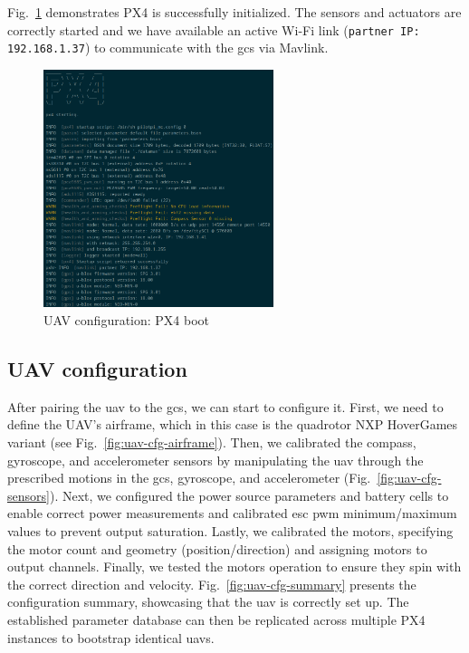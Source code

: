 Fig.~\ref{fig:uav-cfg-px4-boot} demonstrates PX4 is successfully
initialized. The sensors and actuators are correctly started and we have
available an active Wi-Fi link (\lstinline{partner IP: 192.168.1.37}) to communicate with the \gls{gcs} via Mavlink.
  
\begin{figure}[!hbt]
  \centering
  \includegraphics[width=0.6\textwidth]{./img/png/px4-boot} 
  \caption{UAV configuration: PX4 boot}
  \label{fig:uav-cfg-px4-boot}
\end{figure}

\subsection{UAV configuration}
\label{sec:uav-configuration}
After pairing the \gls{uav} to the \gls{gcs}, we can start to configure
it. First, we need to define the UAV's airframe, which in this case is the
quadrotor NXP HoverGames variant (see Fig.~\ref{fig:uav-cfg-airframe}).
Then, we calibrated the compass, gyroscope, and accelerometer sensors by
manipulating the \gls{uav} through the prescribed motions in the \gls{gcs},
gyroscope, and accelerometer (Fig.~\ref{fig:uav-cfg-sensors}).
Next, we configured the power source parameters and battery cells to enable
correct power measurements and calibrated \gls{esc} \gls{pwm} minimum/maximum
values to prevent output saturation.
Lastly, we calibrated the motors, specifying
the motor count and geometry (position/direction) and assigning motors to output
channels. Finally, we tested the motors operation to ensure they spin with the
correct direction and velocity.
Fig.~\ref{fig:uav-cfg-summary} presents the configuration summary, showcasing
that the \gls{uav} is correctly set up. The established parameter database can
then be replicated across multiple PX4 instances to bootstrap identical \glspl{uav}.

